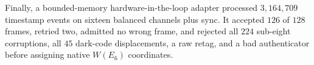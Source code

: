 Finally, a bounded-memory hardware-in-the-loop adapter processed
$3{,}164{,}709$ timestamp events on sixteen balanced channels plus sync.  It
accepted $126$ of $128$ frames, retried two, admitted no wrong frame, and
rejected all $224$ sub-eight corruptions, all $45$ dark-code displacements, a
raw retag, and a bad authenticator before assigning native
$W(E_6)$ coordinates.
